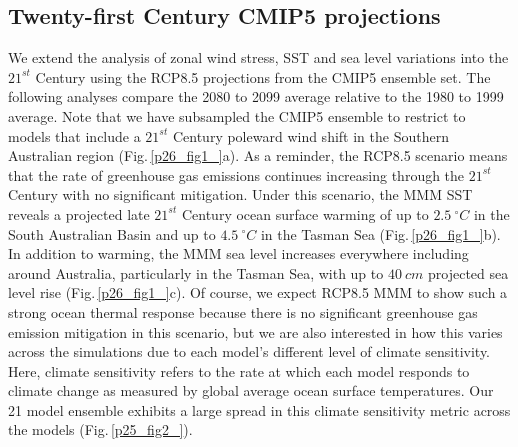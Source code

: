 \documentclass[draft,linenumbers]{agujournal2018}
\begin{document}
\subsection{Twenty-first Century CMIP5 projections}
We extend the analysis of zonal wind stress, SST and sea level variations into the $21^{st}$ Century using the RCP8.5 projections from the CMIP5 ensemble set. The following analyses compare the 2080 to 2099 average relative to the 1980 to 1999 average. Note that we have subsampled the CMIP5 ensemble to restrict to models that include a $21^{st}$ Century poleward wind shift in the Southern Australian region (Fig.\,\ref{p26_fig1_}a). As a reminder, the RCP8.5 scenario means that the rate of greenhouse gas emissions continues increasing through the $21^{st}$ Century with no significant mitigation. Under this scenario, the MMM SST reveals a projected late $21^{st}$ Century ocean surface warming of up to $2.5\ ^{\circ}C$ in the South Australian Basin and up to $4.5\ ^{\circ}C$ in the Tasman Sea (Fig.\,\ref{p26_fig1_}b). In addition to warming, the MMM sea level increases everywhere including around Australia, particularly in the Tasman Sea, with up to $40\ cm$ projected sea level rise (Fig.\,\ref{p26_fig1_}c). Of course, we expect RCP8.5 MMM to show such a strong ocean thermal response because there is no significant greenhouse gas emission mitigation in this scenario, but we are also interested in how this varies across the simulations due to each model's different level of climate sensitivity. Here, climate sensitivity refers to the rate at which each model responds to climate change as measured by global average ocean surface temperatures. Our 21 model ensemble exhibits a large spread in this climate sensitivity metric across the models (Fig.\,\ref{p25_fig2_}).
\end{document}

